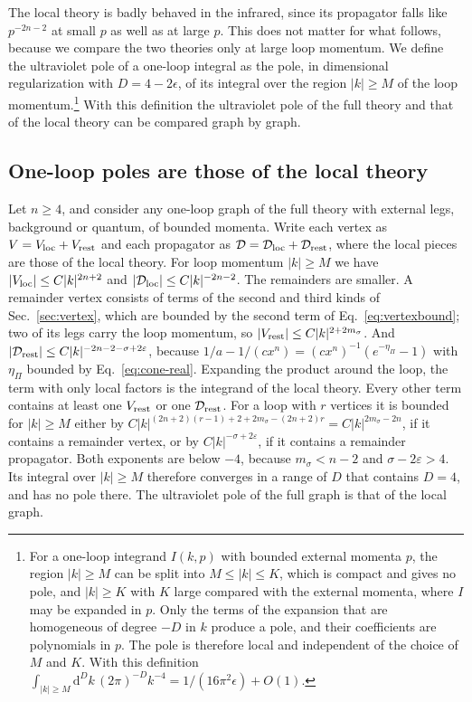 \documentclass[a4paper,11pt]{article}
\newcommand{\dd}{\mathrm{d}}
\begin{document}
The local theory is badly behaved in the infrared, since its propagator falls like $p^{-2n-2}$ at small $p$ as well as at large $p$. This does not matter for what follows, because we compare the two theories only at large loop momentum. We define the ultraviolet pole of a one-loop integral as the pole, in dimensional regularization with $D=4-2\epsilon$, of its integral over the region $|k|\ge M$ of the loop momentum.\footnote{For a one-loop integrand $I(k,p)$ with bounded external momenta $p$, the region $|k|\ge M$ can be split into $M\le|k|\le K$, which is compact and gives no pole, and $|k|\ge K$ with $K$ large compared with the external momenta, where $I$ may be expanded in $p$. Only the terms of the expansion that are homogeneous of degree $-D$ in $k$ produce a pole, and their coefficients are polynomials in $p$. The pole is therefore local and independent of the choice of $M$ and $K$. With this definition $\int_{|k|\ge M}\dd^Dk\,(2\pi)^{-D}k^{-4}=1/(16\pi^2\epsilon)+O(1)$.} With this definition the ultraviolet pole of the full theory and that of the local theory can be compared graph by graph.

\subsection{One-loop poles are those of the local theory}
\label{sec:poles1}

Let $n\ge4$, and consider any one-loop graph of the full theory with external legs, background or quantum, of bounded momenta. Write each vertex as $V=V_{\rm loc}+V_{\rm rest}$ and each propagator as $\mathcal D=\mathcal D_{\rm loc}+\mathcal D_{\rm rest}$, where the local pieces are those of the local theory. For loop momentum $|k|\ge M$ we have $|V_{\rm loc}|\le C|k|^{2n+2}$ and $|\mathcal D_{\rm loc}|\le C|k|^{-2n-2}$. The remainders are smaller. A remainder vertex consists of terms of the second and third kinds of Sec.~\ref{sec:vertex}, which are bounded by the second term of Eq.~\eqref{eq:vertexbound}; two of its legs carry the loop momentum, so $|V_{\rm rest}|\le C|k|^{2+2m_\sigma}$. And $|\mathcal D_{\rm rest}|\le C|k|^{-2n-2-\sigma+2\varepsilon}$, because $1/a-1/(cx^n)=(cx^n)^{-1}(e^{-\eta_\Pi}-1)$ with $\eta_\Pi$ bounded by Eq.~\eqref{eq:cone-real}. Expanding the product around the loop, the term with only local factors is the integrand of the local theory. Every other term contains at least one $V_{\rm rest}$ or one $\mathcal D_{\rm rest}$. For a loop with $r$ vertices it is bounded for $|k|\ge M$ either by $C|k|^{(2n+2)(r-1)+2+2m_\sigma-(2n+2)r}=C|k|^{2m_\sigma-2n}$, if it contains a remainder vertex, or by $C|k|^{-\sigma+2\varepsilon}$, if it contains a remainder propagator. Both exponents are below $-4$, because $m_\sigma<n-2$ and $\sigma-2\varepsilon>4$. Its integral over $|k|\ge M$ therefore converges in a range of $D$ that contains $D=4$, and has no pole there. The ultraviolet pole of the full graph is that of the local graph.
\end{document}
